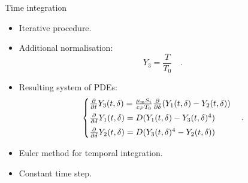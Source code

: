 \documentclass[aspectratio=43]{beamer}
\begin{document}
\begin{frame}{Time integration}
  \begin{itemize}
    \item<1-> Iterative procedure.
    \item<2-> Additional normalisation:
      \begin{equation}
        \label{eq:temperature_normalisation}
        Y_3 = \frac{T}{T_0}
        \quad .
      \end{equation}
    \item<3-> Resulting system of PDEs:
      \begin{equation}
        \label{eq:numerical_radiative_equilibrium}
        \left\{
        \begin{array}{@{}l@{}}
          \pdv*{Y_3(t, \delta)}{t} = \frac{\mu_\text{m} S_\text{t}}{c_P T_0} \pdv*{(Y_1(t, \delta) - Y_2(t, \delta))}{\delta} \\[0.5em]
          \pdv*{Y_1(t, \delta)}{\delta} = D (Y_1(t, \delta) - Y_3(t, \delta)^4) \\[0.5em]
          \pdv*{Y_2(t, \delta)}{\delta} = D (Y_3(t, \delta)^4 - Y_2(t, \delta))
        \end{array}
        \right.
        \quad .
      \end{equation}
    \item<3-> Euler method for temporal integration.
    \item<3-> Constant time step.
  \end{itemize}
\end{frame}
\end{document}
